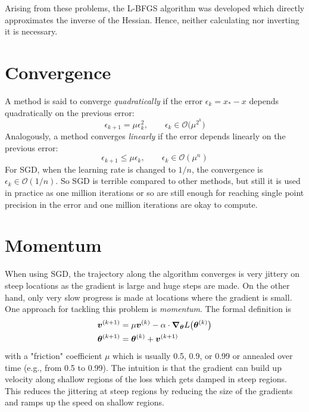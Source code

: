 		Arising from these problems, the L-BFGS algorithm was developed which directly approximates the inverse of the Hessian. Hence, neither calculating nor inverting it is necessary.

	\section{Convergence}
		A method is said to converge \emph{quadratically} if the error \( \epsilon_k = x_\ast - x \) depends quadratically on the previous error:
		\begin{equation}
			\epsilon_{k + 1} = \mu \epsilon_k^2,\qquad \epsilon_k \in \mathcal{O}\big(\mu^{2^k}\big)
		\end{equation}
		Analogously, a method converges \emph{linearly} if the error depends linearly on the previous error:
		\begin{equation}
			\epsilon_{k + 1} \leq \mu \epsilon_k,\qquad \epsilon_k \in \mathcal{O}(\mu^n)
		\end{equation}
		For SGD, when the learning rate is changed to \(1/n\), the convergence is \( \epsilon_k \in \mathcal{O}(1/n) \). So SGD is terrible compared to other methods, but still it is used in practice as one million iterations or so are still enough for reaching single point precision in the error and one million iterations are okay to compute.

	\section{Momentum}
		When using SGD, the trajectory along the algorithm converges is very jittery on steep locations as the gradient is large and huge steps are made. On the other hand, only very slow progress is made at locations where the gradient is small. One approach for tackling this problem is \emph{momentum}. The formal definition is
		\begin{align}
			\bm{v}^{(k + 1)} &= \mu \bm{v}^{(k)} - \alpha \cdot \grad_{\bm{\theta}} L\big(\bm{\theta}^{(k)}\big) \\
			\bm{\theta}^{(k + 1)} &= \bm{\theta}^{(k)} + \bm{v}^{(k + 1)}
		\end{align}
		with a "friction" coefficient \(\mu\) which is usually \num{0.5}, \num{0.9}, or \num{0.99} or annealed over time (e.g., from \num{0.5} to \num{0.99}). The intuition is that the gradient can build up velocity along shallow regions of the loss which gets damped in steep regions. This reduces the jittering at steep regions by reducing the size of the gradients and ramps up the speed on shallow regions.

